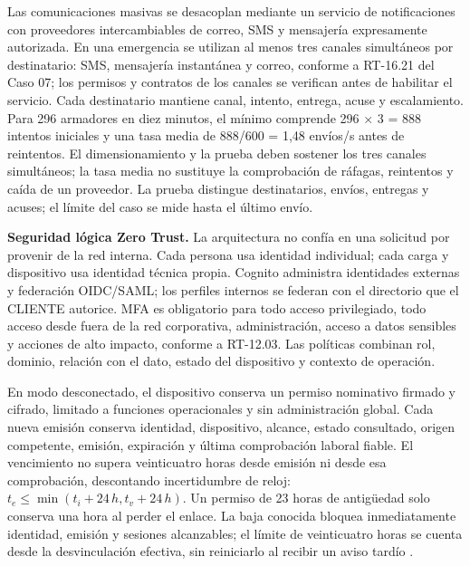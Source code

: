 Las comunicaciones masivas se desacoplan mediante un servicio de notificaciones con proveedores intercambiables de correo, SMS y mensajería expresamente autorizada. En una emergencia se utilizan al menos tres canales simultáneos por destinatario: SMS, mensajería instantánea y correo, conforme a RT-16.21 del Caso 07; los permisos y contratos de los canales se verifican antes de habilitar el servicio. Cada destinatario mantiene canal, intento, entrega, acuse y escalamiento. Para 296 armadores en diez minutos, el mínimo comprende 296 × 3 = 888 intentos iniciales y una tasa media de 888/600 = 1,48 envíos/s antes de reintentos. El dimensionamiento y la prueba deben sostener los tres canales simultáneos; la tasa media no sustituye la comprobación de ráfagas, reintentos y caída de un proveedor. La prueba distingue destinatarios, envíos, entregas y acuses; el límite del caso se mide hasta el último envío.

\textbf{Seguridad lógica Zero Trust.} La arquitectura no confía en una solicitud por provenir de la red interna. Cada persona usa identidad individual; cada carga y dispositivo usa identidad técnica propia. Cognito administra identidades externas y federación OIDC/SAML; los perfiles internos se federan con el directorio que el CLIENTE autorice. MFA es obligatorio para todo acceso privilegiado, todo acceso desde fuera de la red corporativa, administración, acceso a datos sensibles y acciones de alto impacto, conforme a RT-12.03. Las políticas combinan rol, dominio, relación con el dato, estado del dispositivo y contexto de operación.

En modo desconectado, el dispositivo conserva un permiso nominativo firmado y cifrado, limitado a funciones operacionales y sin administración global. Cada nueva emisión conserva identidad, dispositivo, alcance, estado consultado, origen competente, emisión, expiración y última comprobación laboral fiable. El vencimiento no supera veinticuatro horas desde emisión ni desde esa comprobación, descontando incertidumbre de reloj: $t_e\leq\min(t_i+24\,h,t_v+24\,h)$. Un permiso de 23 horas de antigüedad solo conserva una hora al perder el enlace. La baja conocida bloquea inmediatamente identidad, emisión y sesiones alcanzables; el límite de veinticuatro horas se cuenta desde la desvinculación efectiva, sin reiniciarlo al recibir un aviso tardío \parencite[RT-12.07, p.~25; RT-12.10, p.~26]{pucv-transversal}.



